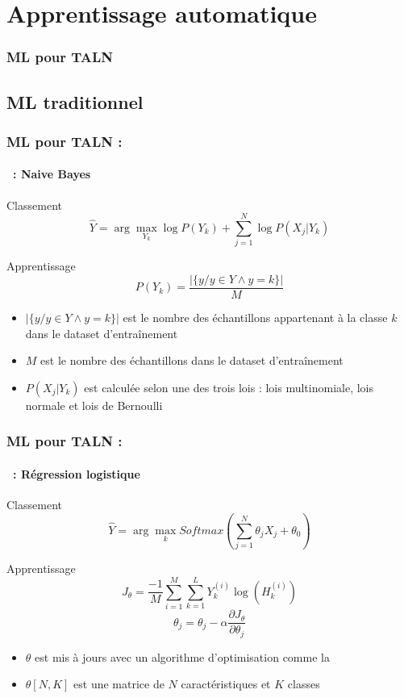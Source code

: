 \documentclass[xcolor=table]{beamer}
\begin{document}
\section{Apprentissage automatique}

\begin{frame}
\frametitle{ML pour TALN}
\framesubtitle{\insertsection}

\end{frame}

\subsection{ML traditionnel}

\begin{frame}
\frametitle{ML pour TALN : \insertsection}
\framesubtitle{\insertsubsection\ : Naive Bayes}

Classement 
\[\hat{Y} = \arg\max_{Y_k} \log P(Y_k) + \sum_{j=1}^{N} \log P(X_j|Y_k)\]

Apprentissage
\[P(Y_k) = \frac{|\{y / y \in Y \wedge y = k\}|}{M}\]

\begin{itemize}
	\item $|\{y / y \in Y \wedge y = k\}|$ est le nombre des échantillons appartenant à la classe $k$ dans le dataset d'entraînement
	\item $M$ est le nombre des échantillons dans le dataset d'entraînement
	\item $P(X_j|Y_k)$ est calculée selon une des trois lois : lois multinomiale, lois normale et lois de Bernoulli
\end{itemize}

\end{frame}

\begin{frame}
	\frametitle{ML pour TALN : \insertsection}
	\framesubtitle{\insertsubsection\ : Régression logistique}
	
	Classement 
	\[\hat{Y} = \arg\max_{k} Softmax(\sum_{j=1}^{N} \theta_j X_j + \theta_0)\]
	
	Apprentissage
	\[J_\theta = \frac{-1}{M} \sum\limits_{i=1}^{M} \sum_{k=1}^{L} Y^{(i)}_k \log(H^{(i)}_k)\]
	\[\theta_j = \theta_j - \alpha \frac{\partial J_\theta}{\partial \theta_j}\]
	
	\begin{itemize}
		\item $\theta$ est mis à jours avec un algorithme d'optimisation comme la 
		\item $\theta[N, K]$ est une matrice de $N$ caractéristiques et $K$ classes
	\end{itemize}
	
\end{frame}
\end{document}
